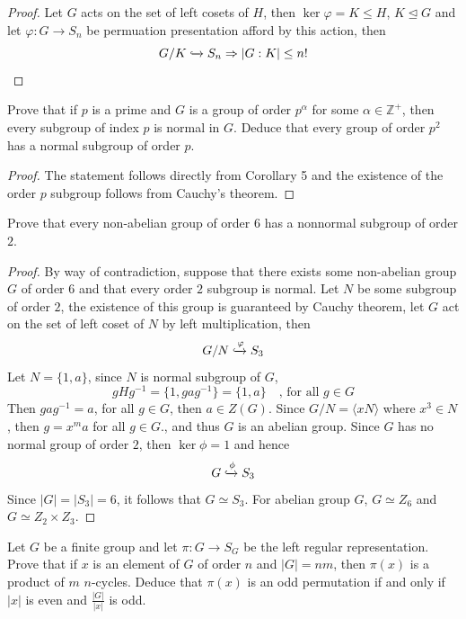 \documentclass{article}
\newcommand{\Z}{\mathbb{Z}}
\newenvironment{problem}[2][Problem]{\begin{trivlist}
\item[\hskip \labelsep {\bfseries #1}\hskip \labelsep {\bfseries #2.}]}{\end{trivlist}}
\begin{document}
\begin{proof}
    Let $G$ acts on the set of left cosets of $H$, then $\ker\varphi = K\leq H$, $K\trianglelefteq G$ and let $\varphi : G \rightarrow S_n$ be permuation presentation afford by this action, then
    \[
    G/K \xhookrightarrow{} S_n \Rightarrow |G: K|\leq n!
    \]
\end{proof}
\begin{problem}{9}
    Prove that if $p$ is a prime and $G$ is a group of order $p^\alpha$ for some $\alpha\in \Z^{+}$, then every subgroup of index $p$ is normal in $G$. Deduce that every group of order $p^2$ has a normal subgroup of order $p$. 
\end{problem}
\begin{proof}
    The statement follows directly from Corollary 5 and the existence of the order $p$ subgroup follows from Cauchy's theorem.
\end{proof}
\begin{problem}{10}
    Prove that every non-abelian group of order $6$ has a nonnormal subgroup of order $2$.
\end{problem}
\begin{proof}
    By way of contradiction, suppose that there exists some non-abelian group $G$ of order $6$ and that every order $2$ subgroup is normal. Let $N$ be some subgroup of order $2$, the existence of this group is guaranteed by Cauchy theorem, let $G$ act on the set of left coset of $N$ by left multiplication, then
    \[
    G/N \xhookrightarrow{\varphi} S_3
    \]
    Let $N=\{1, a\}$, since $N$ is normal subgroup of $G$, 
    \[gHg^{-1}=\{1, gag^{-1}\}=\{1, a\}\quad \text{, for all } g \in G\]
    Then $g a g^{-1}=a$, for all $g \in G$, then $a \in Z(G)$. Since $G/N=\langle xN\rangle$ where $x^3\in N$, then $g =x^ma$ for all $g \in G$., and thus $G$ is an abelian group. Since $G$ has no normal group of order $2$, then $\ker \phi =1$ and hence 
    \[
        G \xhookrightarrow{\phi} S_3
    \]
    Since $|G|=|S_3|=6$, it follows that $G \simeq S_3$. For abelian group $G$, $G \simeq Z_6$ and $G\simeq Z_2 \times Z_3$.
\end{proof}
\begin{problem}{11}
    Let $G$ be a finite group and let $\pi : G \rightarrow S_G$ be the left regular representation. Prove that if $x $ is an element of $G$ of order $n$ and $|G|=nm$, then $\pi(x)$ is a product of $m$ $n$-cycles. Deduce that $\pi(x)$ is an odd permutation if and only if $|x|$ is even and $\frac{|G|}{|x|}$ is odd.
\end{problem}
\end{document}
